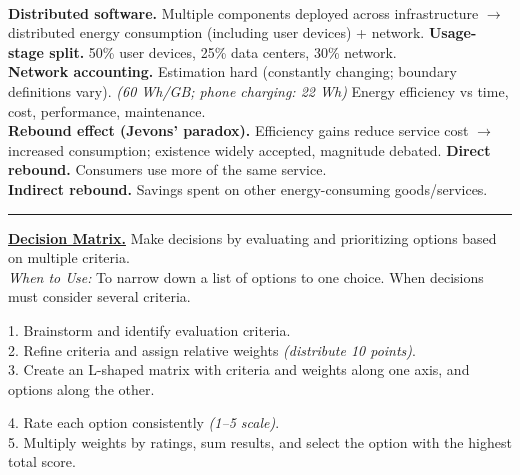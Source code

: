 \documentclass[8pt, a4paper]{extarticle}
\makeatletter
\let\oldwarning\warning
\renewcommand{\warning}{\raisebox{0.3ex}{\oldwarning}}
\renewcommand{\hline}{\noalign{\vskip 2px}\hrule\@height\arrayrulewidth\@width\linewidth\noalign{\vskip 2px}}
\makeatother
\begin{document}
\begin{minipage}[t]{0.49\textwidth}
{\begin{minipage}[htp]{1\textwidth}
\begin{minipage}[t]{0.4\textwidth}
			\end{minipage}\\
			\textbf{Distributed software.} Multiple components deployed across infrastructure $\rightarrow$ distributed energy consumption (including user devices) + network.
			\textbf{Usage-stage split.} 50\% user devices, 25\% data centers, 30\% network.\\
			\textbf{Network accounting.} Estimation hard (constantly changing; boundary definitions vary). \textit{(60 Wh/GB; phone charging: 22 Wh)}
			\warning Energy efficiency vs time, cost, performance, maintenance.\\
			\textbf{Rebound effect (Jevons' paradox).} Efficiency gains reduce service cost $\rightarrow$ increased consumption; existence widely accepted, magnitude debated. \textbf{Direct rebound.} Consumers use more of the same service.\\
			\textbf{Indirect rebound.} Savings spent on other energy-consuming goods/services.\hline
			\ul{\textbf{Decision Matrix.}} Make decisions by evaluating and prioritizing options based on multiple criteria.\\
			\textit{When to Use:} To narrow down a list of options to one choice. When decisions must consider several criteria.\\
			\begin{minipage}[htp]{0.49\textwidth}
				1. Brainstorm and identify evaluation criteria.\\
				2. Refine criteria and assign relative weights \textit{(distribute 10 points)}.\\
				3. Create an L-shaped matrix with criteria and weights along one axis, and options along the other.\\
			\end{minipage}\hfill
			\begin{minipage}[htp]{0.49\textwidth}
				4. Rate each option consistently \textit{(1–5 scale)}.\\
				5. Multiply weights by ratings, sum results, and select the option with the highest total score.\\
			\end{minipage}
		\end{minipage}
	}
\end{minipage}\hspace*{8px}
\end{document}

